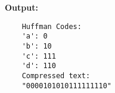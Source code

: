 \textbf{Output:}
\begin{verbatim}
    Huffman Codes:
    'a': 0
    'b': 10
    'c': 111
    'd': 110
    Compressed text:
    "0000101010111111110"
\end{verbatim}






